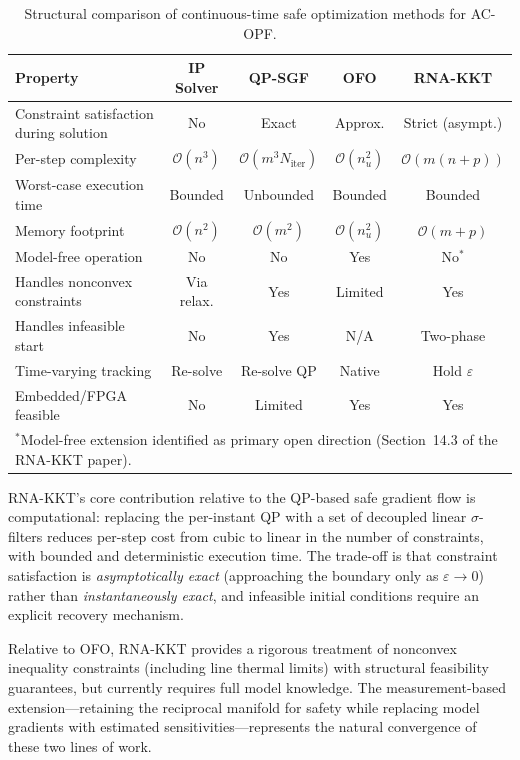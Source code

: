 \documentclass[11pt,onecolumn]{article}
\theoremstyle{definition}
\theoremstyle{remark}
\begin{document}
\begin{table}[ht]
\centering
\caption{Structural comparison of continuous-time safe optimization methods for AC-OPF.}
\label{tab:comparison}
\small
\begin{tabular}{@{}lcccc@{}}
\toprule
\textbf{Property} & \textbf{IP Solver} & \textbf{QP-SGF} & \textbf{OFO} & \textbf{RNA-KKT} \\
\midrule
Constraint satisfaction during solution & No & Exact & Approx. & Strict (asympt.) \\
Per-step complexity & $\mathcal{O}(n^3)$ & $\mathcal{O}(m^3 N_{\text{iter}})$ & $\mathcal{O}(n_u^2)$ & $\mathcal{O}(m(n+p))$ \\
Worst-case execution time & Bounded & Unbounded & Bounded & Bounded \\
Memory footprint & $\mathcal{O}(n^2)$ & $\mathcal{O}(m^2)$ & $\mathcal{O}(n_u^2)$ & $\mathcal{O}(m+p)$ \\
Model-free operation & No & No & Yes & No$^*$ \\
Handles nonconvex constraints & Via relax. & Yes & Limited & Yes \\
Handles infeasible start & No & Yes & N/A & Two-phase \\
Time-varying tracking & Re-solve & Re-solve QP & Native & Hold $\varepsilon$ \\
Embedded/FPGA feasible & No & Limited & Yes & Yes \\
\bottomrule
\multicolumn{5}{l}{\footnotesize $^*$Model-free extension identified as primary open direction (Section~14.3 of the RNA-KKT paper).}
\end{tabular}
\end{table}

RNA-KKT's core contribution relative to the QP-based safe gradient flow is computational: replacing the per-instant QP with a set of decoupled linear $\sigma$-filters reduces per-step cost from cubic to linear in the number of constraints, with bounded and deterministic execution time. The trade-off is that constraint satisfaction is \emph{asymptotically exact} (approaching the boundary only as $\varepsilon \to 0$) rather than \emph{instantaneously exact}, and infeasible initial conditions require an explicit recovery mechanism.

Relative to OFO, RNA-KKT provides a rigorous treatment of nonconvex inequality constraints (including line thermal limits) with structural feasibility guarantees, but currently requires full model knowledge. The measurement-based extension---retaining the reciprocal manifold for safety while replacing model gradients with estimated sensitivities---represents the natural convergence of these two lines of work.
\end{document}
